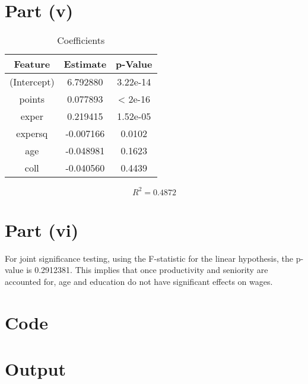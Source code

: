 \documentclass{./solution}
\begin{document}
\begin{solution}[Wooldridge C6.9]
        \section*{Part (v)}
            \begin{table}[H]
                \caption{Coefficients}
                \begin{tabularx}{\textwidth}{C C C}
                    \toprule
                    Feature & Estimate & p-Value \\
                    \midrule
                    (Intercept) &  6.792880 &  3.22e-14 \\
                    points      &  0.077893 &   < 2e-16 \\
                    exper       &  0.219415 &  1.52e-05 \\
                    expersq     & -0.007166 &    0.0102 \\
                    age         & -0.048981 &    0.1623 \\
                    coll        & -0.040560 &    0.4439 \\
                    \bottomrule
                \end{tabularx}
            \end{table}
            \vspace{-5mm}
            $$ R^2 = 0.4872 $$

        \section*{Part (vi)}
            For joint significance testing, using the F-statistic for the linear hypothesis, the p-value is 0.2912381.
            This implies that once productivity and seniority are accounted for, age and education do not have significant effects on wages.

        \section*{Code}

        \section*{Output}
    \end{solution}
\end{document}
